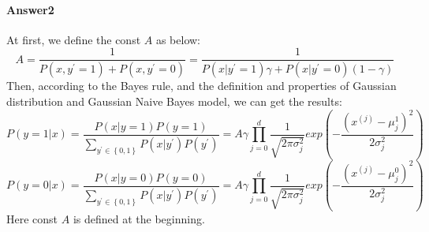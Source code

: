 \documentclass[paper=a4, fontsize=11pt]{scrartcl} %
\numberwithin{equation}{section} %
\numberwithin{figure}{section} %
\numberwithin{table}{section} %
\begin{document}
\paragraph{\textbf{Answer2}}
At first, we define the const $A$ as below:
\begin{equation*}
A =\frac{1}{P\left ( x,y^{'}=1 \right ) +P\left ( x,y^{'}=0 \right )}=\frac{1}{P\left ( x|y^{'}=1 \right )\gamma +P\left ( x|y^{'}=0 \right )\left ( 1-\gamma \right )}
\end{equation*}
Then, according to the Bayes rule, and the definition and properties of Gaussian distribution and Gaussian Naive Bayes model, we can get the results:
\begin{equation*}
P\left ( y=1|x \right )=\frac{P\left ( x|y=1 \right )P\left ( y=1 \right )}{\sum_{y^{'}\in \left \{ 0,1 \right \}}P\left ( x|y^{'} \right )P\left ( y^{'} \right )}=A \gamma\prod_{j=0}^{d}\frac{1}{\sqrt{2\pi \sigma _{j}^{2}}}exp\left ( -\frac{\left ( x^{\left ( j \right )}-\mu _{j}^{1} \right )^{2}}{2\sigma _{j}^{2}} \right )
\end{equation*}
\begin{equation*}
P\left ( y=0|x \right )=\frac{P\left ( x|y=0 \right )P\left ( y=0 \right )}{\sum_{y^{'}\in \left \{ 0,1 \right \}}P\left ( x|y^{'} \right )P\left ( y^{'} \right )}=A \gamma\prod_{j=0}^{d}\frac{1}{\sqrt{2\pi \sigma _{j}^{2}}}exp\left ( -\frac{\left ( x^{\left ( j \right )}-\mu _{j}^{0} \right )^{2}}{2\sigma _{j}^{2}} \right )
\end{equation*}
Here const $A$ is defined at the beginning.
\end{document}
